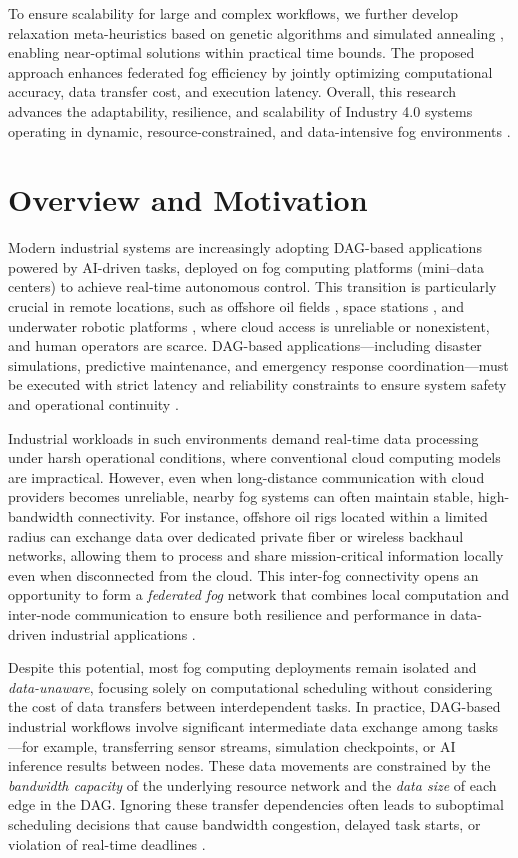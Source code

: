 \documentclass[conference]{IEEEtran}
\begin{document}
To ensure scalability for large and complex workflows, we further develop relaxation meta-heuristics based on genetic algorithms and simulated annealing \cite{kumar2023workload}, enabling near-optimal solutions within practical time bounds. The proposed approach enhances federated fog efficiency by jointly optimizing computational accuracy, data transfer cost, and execution latency. Overall, this research advances the adaptability, resilience, and scalability of Industry 4.0 systems operating in dynamic, resource-constrained, and data-intensive fog environments \cite{fgcs2024}.

\section{Overview and Motivation}

Modern industrial systems are increasingly adopting DAG-based applications powered by AI-driven tasks, deployed on fog computing platforms (mini–data centers) to achieve real-time autonomous control. This transition is particularly crucial in remote locations, such as offshore oil fields \cite{hussain2024resource}, space stations \cite{rehman2018}, and underwater robotic platforms \cite{kabanov2022}, where cloud access is unreliable or nonexistent, and human operators are scarce. DAG-based applications—including disaster simulations, predictive maintenance, and emergency response coordination—must be executed with strict latency and reliability constraints to ensure system safety and operational continuity \cite{wang2021adaptive, rehman2018, cai2019}.

Industrial workloads in such environments demand real-time data processing under harsh operational conditions, where conventional cloud computing models are impractical. However, even when long-distance communication with cloud providers becomes unreliable, nearby fog systems can often maintain stable, high-bandwidth connectivity. For instance, offshore oil rigs located within a limited radius can exchange data over dedicated private fiber or wireless backhaul networks, allowing them to process and share mission-critical information locally even when disconnected from the cloud. This inter-fog connectivity opens an opportunity to form a \textit{federated fog} network that combines local computation and inter-node communication to ensure both resilience and performance in data-driven industrial applications \cite{mattia2023fogcontrol}.

Despite this potential, most fog computing deployments remain isolated and \textit{data-unaware}, focusing solely on computational scheduling without considering the cost of data transfers between interdependent tasks. In practice, DAG-based industrial workflows involve significant intermediate data exchange among tasks---for example, transferring sensor streams, simulation checkpoints, or AI inference results between nodes. These data movements are constrained by the \textit{bandwidth capacity} of the underlying resource network and the \textit{data size} of each edge in the DAG. Ignoring these transfer dependencies often leads to suboptimal scheduling decisions that cause bandwidth congestion, delayed task starts, or violation of real-time deadlines \cite{salehi2016robust}.
\end{document}
